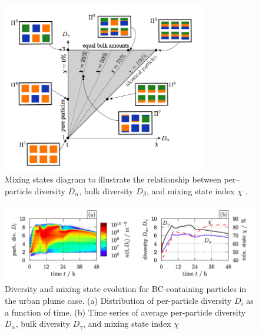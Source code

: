 \documentclass[12pt, fullpage]{uiucthesis2009}
\begin{document}
	 \begin{figure}[h] 
	 	\begin{center}
	 		\includegraphics[width = 0.8\textwidth]{Figure28}
	 		\caption[Mixing states diagram to illustrate the relationship between per--particle diversity $D_{\alpha}$, bulk diversity $D_{\beta}$, and mixing state index $\chi$ \citep{Riemer2013}]{\label{fig_P28} Mixing states diagram to illustrate the relationship between per--particle diversity $D_{\alpha}$, bulk diversity $D_{\beta}$, and mixing state index $\chi$ \citep{Riemer2013}.}
	 	\end{center}
	 \end{figure}
	
	\begin{figure}[h] 
		\begin{center}
			\includegraphics[width = 1\textwidth]{Figure06}
			\caption[Diversity and mixing state evolution for BC-containing particles in the urban plume case. (a) Distribution of per-particle diversity $D_{i}$ as a function of time. (b) Time series of average per-particle diversity $D_{\alpha}$, bulk diversity D$D_{\gamma}$, and mixing state index $\chi$ \citep{Riemer2013}]{\label{fig_P6} Diversity and mixing state evolution for BC-containing particles in the urban plume case. (a) Distribution of per-particle diversity $D_{i}$ as a function of time. (b) Time series of average per-particle diversity $D_{\alpha}$, bulk diversity $D_{\gamma}$, and mixing state index $\chi$ \citep{Riemer2013}}
		\end{center}
	\end{figure}
	
\end{document}
